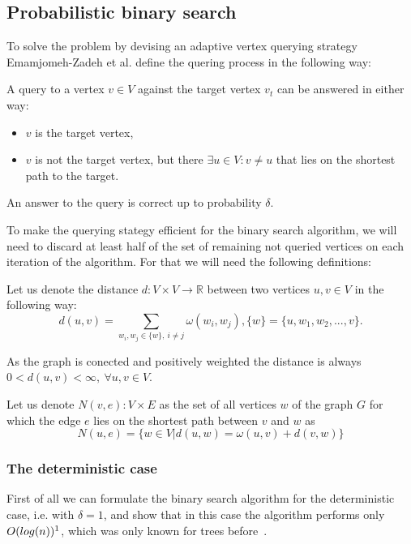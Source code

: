 \subsection*{Probabilistic binary search}
To solve the problem by devising an adaptive vertex querying strategy Emamjomeh-Zadeh et al. define the quering process in the following way:
\begin{definition}
A query to a vertex $v \in V$ against the target vertex $v_t$ can be answered in either way: 
\begin{itemize}
	\item $v$ is the target vertex,
	\item $v$ is not the target vertex, but there $\exists u \in V: v \ne u$ that lies on the shortest path to the target.
\end{itemize}


An answer to the query is correct up to probability $\delta$.
\label{pbs_def}
\end{definition}


To make the querying stategy efficient for the binary search algorithm, we will need to discard at least half of the set of remaining not queried vertices on each iteration of the algorithm. For that we will need the following definitions:
\begin{definition}
Let us denote the distance $d: V \times V \rightarrow \mathds{R}$ between two vertices $u, v \in V$ in the following way:
	\[ d(u, v) = \sum \limits_{w_i, w_j \in \{w\},~i \ne j} \omega(w_i, w_j), \{w\} = \{u, w_1, w_2, ..., v\}. \]
\end{definition}
As the graph is conected and positively weighted the distance is always $0 < d(u, v) < \infty,~\forall u, v \in V$.


\begin{definition}
Let us denote $N(v, e): V \times E$ as the set of all vertices $w$ of the graph $G$ for which the edge $e$ lies on the shortest path between $v$ and $w$ as
	\[N(u, e) = \{ w \in V | d(u, w) = \omega(u, v) + d(v, w) \}\]
\end{definition}


\subsubsection*{The deterministic case}
First of all we can formulate the binary search algorithm for the deterministic case, i.e. with $\delta = 1$, and show that in this case the algorithm performs only $O(log(n))\footnotemark[1]$, which was only known for trees before~\cite{main}.



